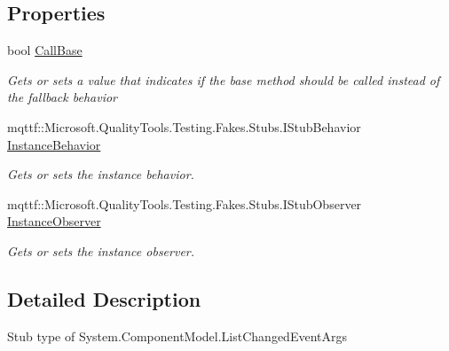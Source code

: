 \subsection*{Properties}
\begin{DoxyCompactItemize}
\item 
bool \hyperlink{class_system_1_1_component_model_1_1_fakes_1_1_stub_list_changed_event_args_ab76c6421f170a0142ae75a001e43779b}{Call\-Base}
\begin{DoxyCompactList}\small\item\em Gets or sets a value that indicates if the base method should be called instead of the fallback behavior\end{DoxyCompactList}\item 
mqttf\-::\-Microsoft.\-Quality\-Tools.\-Testing.\-Fakes.\-Stubs.\-I\-Stub\-Behavior \hyperlink{class_system_1_1_component_model_1_1_fakes_1_1_stub_list_changed_event_args_ab4fbaa4509e0ac457b439e455ae3cb6e}{Instance\-Behavior}
\begin{DoxyCompactList}\small\item\em Gets or sets the instance behavior.\end{DoxyCompactList}\item 
mqttf\-::\-Microsoft.\-Quality\-Tools.\-Testing.\-Fakes.\-Stubs.\-I\-Stub\-Observer \hyperlink{class_system_1_1_component_model_1_1_fakes_1_1_stub_list_changed_event_args_ae47785a84fa874fe08e22627ad13d1c6}{Instance\-Observer}
\begin{DoxyCompactList}\small\item\em Gets or sets the instance observer.\end{DoxyCompactList}\end{DoxyCompactItemize}


\subsection{Detailed Description}
Stub type of System.\-Component\-Model.\-List\-Changed\-Event\-Args



